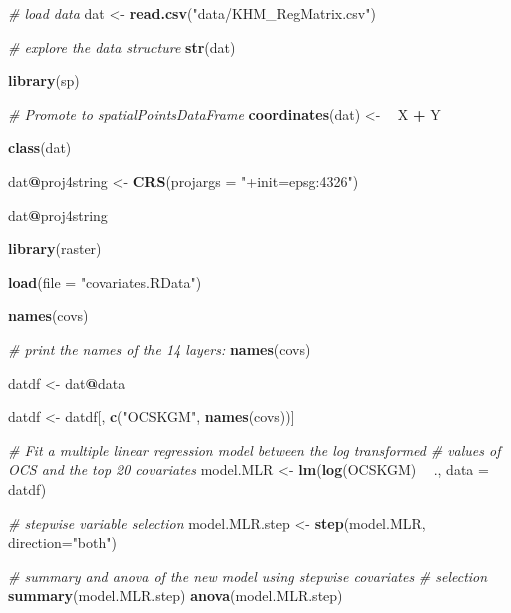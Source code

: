 \documentclass[10pt,b5paper,]{book}
\newenvironment{Shaded}{\begin{snugshade}}{\end{snugshade}}
\newcommand{\CommentTok}[1]{\textcolor[rgb]{0.56,0.35,0.01}{\textit{#1}}}
\newcommand{\DataTypeTok}[1]{\textcolor[rgb]{0.13,0.29,0.53}{#1}}
\newcommand{\ErrorTok}[1]{\textcolor[rgb]{0.64,0.00,0.00}{\textbf{#1}}}
\newcommand{\KeywordTok}[1]{\textcolor[rgb]{0.13,0.29,0.53}{\textbf{#1}}}
\newcommand{\NormalTok}[1]{#1}
\newcommand{\OperatorTok}[1]{\textcolor[rgb]{0.81,0.36,0.00}{\textbf{#1}}}
\newcommand{\StringTok}[1]{\textcolor[rgb]{0.31,0.60,0.02}{#1}}
\theoremstyle{definition}
\theoremstyle{definition}
\theoremstyle{definition}
\theoremstyle{remark}
\begin{document}
\begin{Shaded}
\begin{Highlighting}[]
\CommentTok{# load data}
\NormalTok{dat <-}\StringTok{ }\KeywordTok{read.csv}\NormalTok{(}\StringTok{"data/KHM_RegMatrix.csv"}\NormalTok{)}

\CommentTok{# explore the data structure}
\KeywordTok{str}\NormalTok{(dat)}

\KeywordTok{library}\NormalTok{(sp)}

\CommentTok{# Promote to spatialPointsDataFrame}
\KeywordTok{coordinates}\NormalTok{(dat) <-}\StringTok{ }\ErrorTok{~}\StringTok{ }\NormalTok{X }\OperatorTok{+}\StringTok{ }\NormalTok{Y}

\KeywordTok{class}\NormalTok{(dat)}

\NormalTok{dat}\OperatorTok{@}\NormalTok{proj4string <-}\StringTok{ }\KeywordTok{CRS}\NormalTok{(}\DataTypeTok{projargs =} \StringTok{"+init=epsg:4326"}\NormalTok{)}

\NormalTok{dat}\OperatorTok{@}\NormalTok{proj4string}

\KeywordTok{library}\NormalTok{(raster)}

\KeywordTok{load}\NormalTok{(}\DataTypeTok{file =} \StringTok{"covariates.RData"}\NormalTok{)}

\KeywordTok{names}\NormalTok{(covs)}

\CommentTok{# print the names of the 14 layers:}
\KeywordTok{names}\NormalTok{(covs)}

\NormalTok{datdf <-}\StringTok{ }\NormalTok{dat}\OperatorTok{@}\NormalTok{data}

\NormalTok{datdf <-}\StringTok{ }\NormalTok{datdf[, }\KeywordTok{c}\NormalTok{(}\StringTok{"OCSKGM"}\NormalTok{, }\KeywordTok{names}\NormalTok{(covs))]}

\CommentTok{# Fit a multiple linear regression model between the log transformed}
\CommentTok{# values of OCS and the top 20 covariates}
\NormalTok{model.MLR <-}\StringTok{ }\KeywordTok{lm}\NormalTok{(}\KeywordTok{log}\NormalTok{(OCSKGM) }\OperatorTok{~}\StringTok{ }\NormalTok{., }\DataTypeTok{data =}\NormalTok{ datdf)}

\CommentTok{# stepwise variable selection}
\NormalTok{model.MLR.step <-}\StringTok{ }\KeywordTok{step}\NormalTok{(model.MLR, }\DataTypeTok{direction=}\StringTok{"both"}\NormalTok{)}

\CommentTok{# summary and anova of the new model using stepwise covariates}
\CommentTok{# selection}
\KeywordTok{summary}\NormalTok{(model.MLR.step)}
\KeywordTok{anova}\NormalTok{(model.MLR.step)}


\end{Highlighting}
\end{Shaded}
\end{document}
